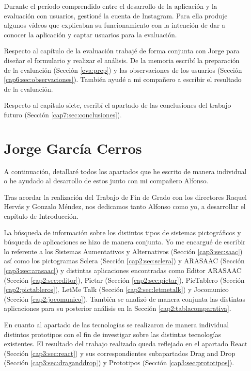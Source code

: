 Durante el período comprendido entre el desarrollo de la aplicación y la evaluación con usuarios, gestioné la cuenta de Instagram. Para ella produje algunos vídeos que explicaban su funcionamiento con la intención de dar a conocer la aplicación y captar usuarios para la evaluación. 

Respecto al capítulo de la evaluación trabajé de forma conjunta con Jorge para diseñar el formulario y realizar el análisis. De la memoria escribí la preparación de la evaluación (Sección \ref{eva:prep}) y las observaciones de los usuarios (Sección \ref{cap6:sec:observaciones}). También ayudé a mi compañero a escribir el resultado de la evaluación. 

Respecto al capítulo siete, escribí el apartado de las conclusiones del trabajo futuro (Sección \ref{cap7:sec:conclusiones}).



\section{Jorge García Cerros}

A continuación, detallaré todos los apartados que he escrito de manera individual o he ayudado al desarrollo de estos junto con mi compañero Alfonso.


Tras acordar la realización del Trabajo de Fin de Grado con los directores Raquel Hervás y Gonzalo Méndez, nos dedicamos tanto Alfonso como yo, a desarrollar el capítulo de Introducción.


La búsqueda de información sobre los distintos tipos de sistemas pictográficos y búsqueda de aplicaciones se hizo de manera conjunta. Yo me encargué de escribir lo referente a los Sistemas Aumentativos y Alternativos (Sección \ref{cap3:sec:saac}) así como los pictogramas Sclera (Sección \ref{cap2:sec:sclera}) y ARASAAC (Sección \ref{cap3:sec:arasaac}) y distintas aplicaciones encontradas como Editor ARASAAC (Sección \ref{cap2:sec:editor}), Pictar (Sección \ref{cap2:sec:pictar}), PicTablero (Sección \ref{cap2:pictableros}), LetMe Talk (Sección \ref{cap2:sec:letmetalk}) y Jocomunico (Sección \ref{cap2:jocomunico}). También se analizó de manera conjunta las distintas aplicaciones para su posterior análisis en la Sección \ref{cap2:tablacomparativa}.


En cuanto al apartado de las tecnologías se realizaron de manera individual distintos prototipos con el fin de investigar sobre las distintas tecnologías existentes. El resultado del trabajo realizado queda reflejado en el apartado React (Sección \ref{cap3:sec:react}) y sus correspondientes subapartados Drag and Drop (Sección \ref{cap3:sec:draganddrop}) y Prototipos (Sección \ref{cap3:sec:prototipos}).


